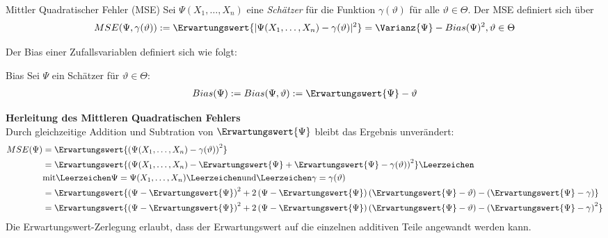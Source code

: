 \begin{Definition}{Mittler Quadratischer Fehler (MSE)}
		Sei $\Psi(X_1,\dots, X_n)$ eine \textit{Schätzer} für die Funktion $\gamma(\vartheta)$ für alle $\vartheta\in \Theta$. Der \gls{MSE} definiert sich über 
\begin{align}
	MSE(\Psi, \gamma(\vartheta)):= \Erwartungswert{\lvert \Psi(X_1,\dots, X_n) -\gamma(\vartheta)\rvert^2} = \Varianz{\Psi} - Bias(\Psi)^2 , \vartheta\in \Theta  
\end{align}
\end{Definition}

Der Bias einer Zufallsvariablen definiert sich wie folgt:

\begin{Lemma-Definition}{Bias}
Sei $\Psi$ ein Schätzer für $\vartheta\in \Theta$:
	\begin{align}
		Bias(\Psi):= Bias(\Psi, \vartheta):= \Erwartungswert{\Psi} - \vartheta
	\end{align}
\end{Lemma-Definition}

\textbf{Herleitung des Mittleren Quadratischen Fehlers}\\

Durch gleichzeitige Addition und Subtration von $\Erwartungswert{\Psi}$ bleibt das Ergebnis unverändert:
\begin{align}
	MSE(\Psi) 
	&= \Erwartungswert{
		\left(
			\Psi(X_1,\dots, X_n) - \gamma(\vartheta)
		\right)^2
	} \\
	&= \Erwartungswert{
		\left(
			\Psi(X_1,\dots, X_n) 
			- \Erwartungswert{\Psi} + \Erwartungswert{\Psi} 
			- \gamma(\vartheta)
		\right)^2
	}  \Leerzeichen \\
&\text{mit}\Leerzeichen \Psi =  \Psi(X_1,\dots, X_n) \Leerzeichen \text{und}\Leerzeichen \gamma = \gamma(\vartheta)\\
	&= \Erwartungswert{
		\left(\Psi - \Erwartungswert{\Psi}\right)^2 
		+ 
		2\left(\Psi - \Erwartungswert{\Psi}\right)
		\left(\Erwartungswert{\Psi} - \vartheta \right) 
		- 
		\left(\Erwartungswert{\Psi} - \gamma \right)
	}\\
	&= \Erwartungswert{
		\left(\Psi - \Erwartungswert{\Psi}\right)^2 
		+ 
		2\left(\Psi - \Erwartungswert{\Psi}\right)
		\left(\Erwartungswert{\Psi} - \vartheta \right) 
		- 
		\left(\Erwartungswert{\Psi} - \gamma \right)^2
	}\\
\end{align}
Die Erwartungswert-Zerlegung erlaubt, dass der Erwartungswert auf die einzelnen additiven Teile angewandt werden kann.

